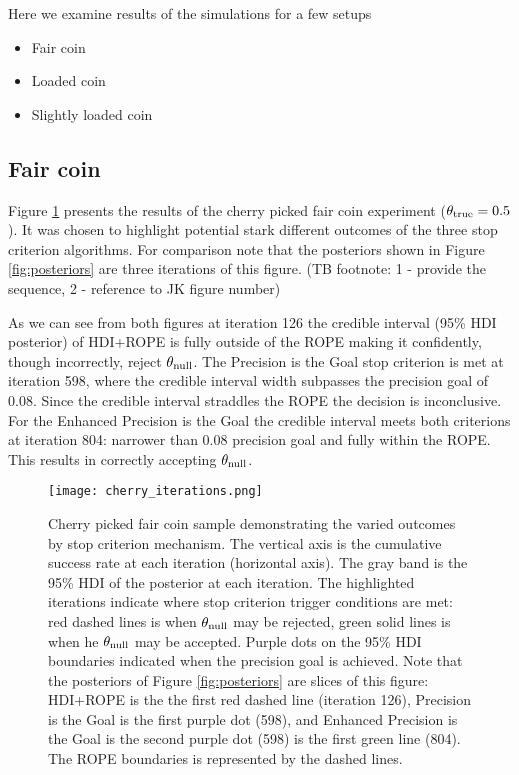 
Here we examine results of the simulations for a few setups

\begin{itemize}
  \item Fair coin
  \item Loaded coin
  \item Slightly loaded coin
\end{itemize}

\subsection{Fair coin}

Figure \ref{fig:iterations} presents the results of the cherry picked fair coin
experiment ($\theta_{\rm true}=0.5$). It was chosen to highlight potential stark
different outcomes of the three stop criterion algorithms. For comparison note that the posteriors
shown in Figure \ref{fig:posteriors} are three iterations of this figure.
(TB footnote: 1 - provide the sequence, 2 - reference to JK figure number)

As we can see from both figures at iteration 126 the credible interval (95\% HDI posterior) of HDI+ROPE is fully
outside of the ROPE making it confidently, though incorrectly, reject $\theta_{\rm null}$.
The Precision is the Goal stop criterion is met at iteration 598, where the credible
interval width
subpasses the precision goal of 0.08. Since the credible interval straddles the ROPE
the decision is inconclusive.
For the Enhanced Precision is the Goal the credible interval
meets both criterions at iteration 804: narrower than 0.08 precision goal and fully within the ROPE.
This results in correctly accepting $\theta_{\rm null}$.


\begin{figure}[h!]
  \centering
  \texttt{[image: cherry\_iterations.png]}
  \caption{Cherry picked fair coin sample demonstrating the varied outcomes by
  stop criterion mechanism. The vertical axis is the cumulative success rate
  at each iteration (horizontal axis).
  The gray band is the 95\% HDI of the posterior at each iteration.
  The highlighted iterations indicate where stop criterion trigger conditions are met:
  red dashed lines is when  $\theta_{\rm null}$ may be rejected, green solid lines
  is when he $\theta_{\rm null}$ may be accepted. Purple dots on the 95\% HDI boundaries
  indicated when the precision goal is achieved. Note that the posteriors of Figure \ref{fig:posteriors}
  are slices of this figure: HDI+ROPE is the the first red dashed line (iteration 126),
  Precision is the Goal is the first purple dot (598), and Enhanced Precision is the Goal is the second purple dot (598)
  is the first green line (804). The ROPE boundaries is represented by the dashed lines.
  }
  \label{fig:iterations}
\end{figure}

